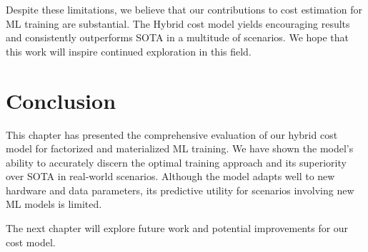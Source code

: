 Despite these limitations, we believe that our contributions to cost estimation for ML training are substantial. The Hybrid cost model yields encouraging results and consistently outperforms SOTA in a multitude of scenarios. We hope that this work will inspire continued exploration in this field.

\section{Conclusion}
\label{sec:eval-conclusion}
This chapter has presented the comprehensive evaluation of our hybrid cost model for factorized and materialized ML training. We have shown the model's ability to accurately discern the optimal training approach and its superiority over SOTA in real-world scenarios. Although the model adapts well to new hardware and data parameters, its predictive utility for scenarios involving new ML models is limited.

The next chapter will explore future work and potential improvements for our cost model.

